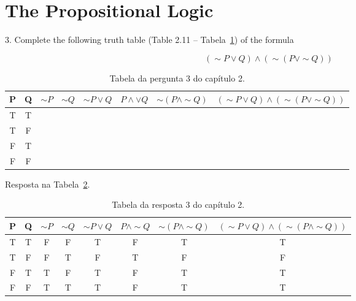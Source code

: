 \section{The Propositional Logic}
3. Complete the following truth table (Table 2.11 -- Tabela~\ref{tab:pergunta2.3}) of the formula

\begin{equation}
 (\sim P \vee Q) \wedge (\sim(P \vee \sim Q))
\end{equation}

\begin{table}
 \begin{tabular}{cccccccc}
  \hline
  P & Q & $\sim P$ & $\sim Q$ & $\sim P \vee Q$ & $P \wedge \vee Q$ & $\sim(P \wedge \sim Q)$ & $(\sim P \vee Q) \wedge (\sim(P \vee \sim Q))$ \\
  \hline
  T & T & & & & & & \\
  T & F & & & & & & \\
  F & T & & & & & & \\
  F & F & & & & & & \\
  \hline
 \end{tabular}
 \caption{Tabela da pergunta 3 do capítulo 2.}
 \label{tab:pergunta2.3}
\end{table}

Resposta na Tabela~\ref{tab:resposta2.3}.

\begin{table}
 \begin{tabular}{cccccccc}
  \hline
  P & Q & $\sim P$ & $\sim Q$ & $\sim P \vee Q$ & $P \wedge \sim Q$ & $\sim(P \wedge \sim Q)$ & $(\sim P \vee Q) \wedge (\sim(P \wedge \sim Q))$ \\
  \hline
  T & T & F & F & T & F & T & T \\
  T & F & F & T & F & T & F & F \\
  F & T & T & F & T & F & T & T \\
  F & F & T & T & T & F & T & T \\
  \hline
 \end{tabular}
 \caption{Tabela da resposta 3 do capítulo 2.}
 \label{tab:resposta2.3}
\end{table}

